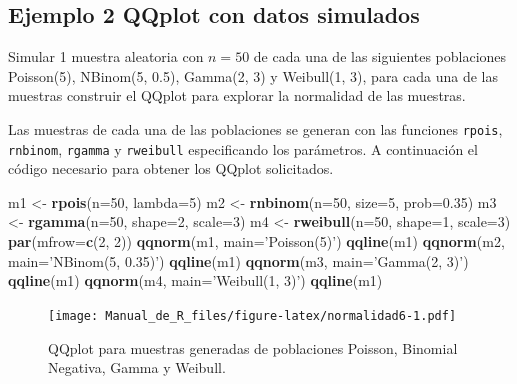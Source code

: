 \documentclass[10pt,]{krantz}
\makeatletter
\newenvironment{Shaded}{\begin{snugshade}}{\end{snugshade}}
\newcommand{\KeywordTok}[1]{\textcolor[rgb]{0.13,0.29,0.53}{\textbf{#1}}}
\newcommand{\DataTypeTok}[1]{\textcolor[rgb]{0.13,0.29,0.53}{#1}}
\newcommand{\DecValTok}[1]{\textcolor[rgb]{0.00,0.00,0.81}{#1}}
\newcommand{\FloatTok}[1]{\textcolor[rgb]{0.00,0.00,0.81}{#1}}
\newcommand{\StringTok}[1]{\textcolor[rgb]{0.31,0.60,0.02}{#1}}
\newcommand{\NormalTok}[1]{#1}
\newenvironment{kframe}{%
\medskip{}
\setlength{\fboxsep}{.8em}
 \def\at@end@of@kframe{}%
 \ifinner\ifhmode%
  \def\at@end@of@kframe{\end{minipage}}%
  \begin{minipage}{\columnwidth}%
 \fi\fi%
 \def\FrameCommand##1{\hskip\@totalleftmargin \hskip-\fboxsep
 \colorbox{shadecolor}{##1}\hskip-\fboxsep
     \hskip-\linewidth \hskip-\@totalleftmargin \hskip\columnwidth}%
 \MakeFramed {\advance\hsize-\width
   \@totalleftmargin\z@ \linewidth\hsize
   \@setminipage}}%
 {\par\unskip\endMakeFramed%
 \at@end@of@kframe}
\renewenvironment{Shaded}{\begin{kframe}}{\end{kframe}}
\makeatother
\begin{document}
\subsection*{Ejemplo 2 QQplot con datos
simulados}\label{ejemplo-2-qqplot-con-datos-simulados}


Simular 1 muestra aleatoria con \(n=50\) de cada una de las siguientes
poblaciones Poisson(5), NBinom(5, 0.5), Gamma(2, 3) y Weibull(1, 3),
para cada una de las muestras construir el QQplot para explorar la
normalidad de las muestras.

Las muestras de cada una de las poblaciones se generan con las funciones
\texttt{rpois}, \texttt{rnbinom}, \texttt{rgamma} y \texttt{rweibull}
especificando los parámetros. A continuación el código necesario para
obtener los QQplot solicitados.

\begin{Shaded}
\begin{Highlighting}[]
\NormalTok{m1 <-}\StringTok{ }\KeywordTok{rpois}\NormalTok{(}\DataTypeTok{n=}\DecValTok{50}\NormalTok{, }\DataTypeTok{lambda=}\DecValTok{5}\NormalTok{)}
\NormalTok{m2 <-}\StringTok{ }\KeywordTok{rnbinom}\NormalTok{(}\DataTypeTok{n=}\DecValTok{50}\NormalTok{, }\DataTypeTok{size=}\DecValTok{5}\NormalTok{, }\DataTypeTok{prob=}\FloatTok{0.35}\NormalTok{)}
\NormalTok{m3 <-}\StringTok{ }\KeywordTok{rgamma}\NormalTok{(}\DataTypeTok{n=}\DecValTok{50}\NormalTok{, }\DataTypeTok{shape=}\DecValTok{2}\NormalTok{, }\DataTypeTok{scale=}\DecValTok{3}\NormalTok{)}
\NormalTok{m4 <-}\StringTok{ }\KeywordTok{rweibull}\NormalTok{(}\DataTypeTok{n=}\DecValTok{50}\NormalTok{, }\DataTypeTok{shape=}\DecValTok{1}\NormalTok{, }\DataTypeTok{scale=}\DecValTok{3}\NormalTok{)}
\KeywordTok{par}\NormalTok{(}\DataTypeTok{mfrow=}\KeywordTok{c}\NormalTok{(}\DecValTok{2}\NormalTok{, }\DecValTok{2}\NormalTok{))}
\KeywordTok{qqnorm}\NormalTok{(m1, }\DataTypeTok{main=}\StringTok{'Poisson(5)'}\NormalTok{)}
\KeywordTok{qqline}\NormalTok{(m1)}
\KeywordTok{qqnorm}\NormalTok{(m2, }\DataTypeTok{main=}\StringTok{'NBinom(5, 0.35)'}\NormalTok{)}
\KeywordTok{qqline}\NormalTok{(m1)}
\KeywordTok{qqnorm}\NormalTok{(m3, }\DataTypeTok{main=}\StringTok{'Gamma(2, 3)'}\NormalTok{)}
\KeywordTok{qqline}\NormalTok{(m1)}
\KeywordTok{qqnorm}\NormalTok{(m4, }\DataTypeTok{main=}\StringTok{'Weibull(1, 3)'}\NormalTok{)}
\KeywordTok{qqline}\NormalTok{(m1)}
\end{Highlighting}
\end{Shaded}

\begin{figure}
\centering
\texttt{[image: Manual\_de\_R\_files/figure-latex/normalidad6-1.pdf]}
\caption{\label{fig:normalidad6}QQplot para muestras generadas de
poblaciones Poisson, Binomial Negativa, Gamma y Weibull.}
\end{figure}
\end{document}
